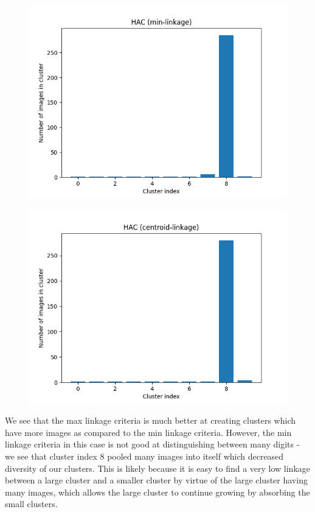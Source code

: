\documentclass[submit]{harvardml}
\begin{document}
\begin{enumerate}
\begin{figure}[h!]
        \end{figure}
    \begin{figure}[h!]
            \centering
            \includegraphics[height=0.4\textheight]{HW4/P5_hac_min.png}
        \end{figure}
    \begin{figure}[h!]
            \centering
            \includegraphics[height=0.4\textheight]{HW4/P5_hac_centroid.png}
        \end{figure}
    We see that the max linkage criteria is much better at creating clusters which have more images as compared to the min linkage criteria. However, the min linkage criteria in this case is not good at distinguishing between many digits - we see that cluster index 8 pooled many images into itself which decreased diversity of our clusters. This is likely because it is easy to find a very low linkage between a large cluster and a smaller cluster by virtue of the large cluster having many images, which allows the large cluster to continue growing by absorbing the small clusters. \\

\end{enumerate}
\end{document}
